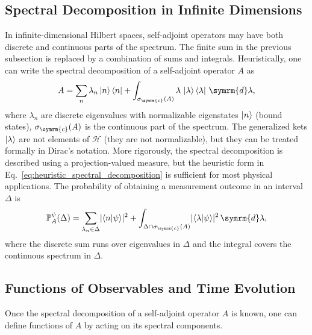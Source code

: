 \subsection{Spectral Decomposition in Infinite Dimensions}\label{sec:spectral_decompositions_in_infinite_dimensions}
In infinite-dimensional Hilbert spaces, self-adjoint operators may have both discrete and continuous parts of the spectrum. The finite sum in the previous subsection is replaced by a combination of sums and integrals. Heuristically, one can write the spectral decomposition of a self-adjoint operator $A$ as\supercite{1021172445}
\begin{equation}\label{eq:heuristic_spectral_decomposition}
A=\sum_n\lambda_n\ket{n}\bra{n}+\int_{\sigma_{\symrm{c}}(A)} \lambda\,\ket{\lambda}\bra{\lambda}\,\symrm{d}\lambda,
\end{equation}
where $\lambda_n$ are discrete eigenvalues with normalizable eigenstates $\ket{n}$ (bound states), $\sigma_{\symrm{c}}(A)$ is the continuous part of the spectrum. The generalized kets $\ket{\lambda}$ are not elements of $\mathcal{H}$ (they are not normalizable), but they can be treated formally in Dirac’s notation. More rigorously, the spectral decomposition is described using a projection-valued measure, but the heuristic form in Eq.~\eqref{eq:heuristic_spectral_decomposition} is sufficient for most physical applications. The probability of obtaining a measurement outcome in an interval $\Delta$ is
\begin{equation}
\mathbb P_A^\psi(\Delta)=\sum_{\lambda_n\in\Delta}\lvert\braket{n\vert\psi}\rvert^2+\int_{\Delta\cap\sigma_{\symrm{c}}(A)}\lvert\braket{\lambda\vert\psi}\rvert^2\,\symrm{d}\lambda,
\end{equation}
where the discrete sum runs over eigenvalues in $\Delta$ and the integral covers the continuous spectrum in $\Delta$.
\subsection{Functions of Observables and Time Evolution}\label{sec:functions_of_observables_and_time_evolution}
Once the spectral decomposition of a self-adjoint operator $A$ is known, one can define functions of $A$ by acting on its spectral components.

